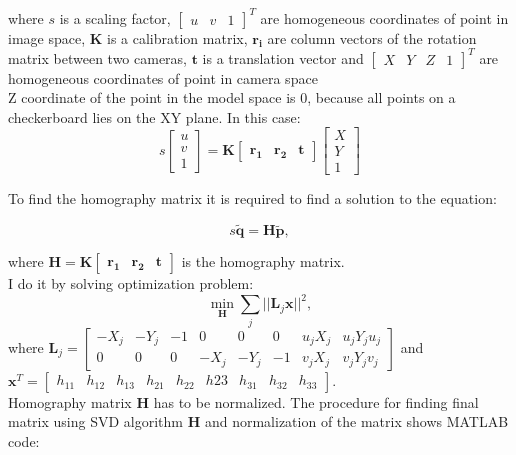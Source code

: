 where $s$ is a scaling factor,
$\begin{bmatrix}u & v & 1\end{bmatrix}^T$ are homogeneous coordinates of point in image space, 
$\mathbf{K}$ is a calibration matrix, 
$\mathbf{r_i}$ are column vectors of the rotation matrix between two cameras, $\mathbf{t}$ is a translation vector and
$\begin{bmatrix}X & Y & Z & 1\end{bmatrix}^T$ are homogeneous coordinates of point in camera space
\\
Z coordinate of the point in the model space is 0, because all points on a checkerboard lies on the XY plane. In this case:
$$s\begin{bmatrix}u \\ v \\ 1\end{bmatrix} =
\mathbf{K}\begin{bmatrix}\mathbf{r_1} & \mathbf{r_2} & \mathbf{t} \end{bmatrix}\begin{bmatrix}X \\ Y \\ 1\end{bmatrix}$$

To find the homography matrix it is required to find a solution to the equation:

$$s\mathbf{\widetilde{q}} = \mathbf{H}\mathbf{\widetilde{p}},$$

where $\mathbf{H}=\mathbf{K}\begin{bmatrix} \mathbf{r_1} & \mathbf{r_2} & \mathbf{t}\end{bmatrix}$ is the homography matrix.\\

I do it by solving optimization problem:
$$\min_{\mathbf{H}}\sum_{j}||\mathbf{L}_j\mathbf{x}||^2,$$ where
$\mathbf{L}_j = 
\begin{bmatrix}
-X_j & -Y_j & -1 & 0 & 0 & 0 & u_jX_j & u_jY_j u_j \\
0 & 0 & 0 & -X_j & -Y_j & -1 & v_jX_j & v_jY_j v_j
\end{bmatrix}$ and \\
$\mathbf{x}^T = 
\begin{bmatrix}
h_{11} & h_{12} & h_{13} & h_{21} & h_{22} & h{23} & h_{31} & h_{32} & h_{33}
\end{bmatrix}$. \\

Homography matrix $\mathbf{H}$ has to be normalized. The procedure for finding final matrix using SVD algorithm $\mathbf{H}$ and normalization of the matrix shows MATLAB code:

